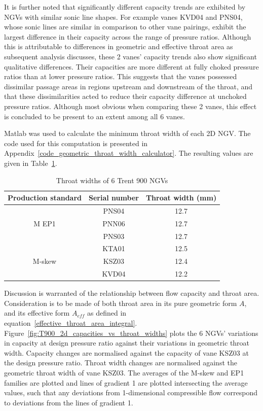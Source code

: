 \documentclass[a4paper, 11pt, oneside]{report}
\begin{document}
It is further noted that significantly different capacity trends are exhibited by NGVs with similar sonic line shapes. For example vanes KVD04 and PNS04, whose sonic lines are similar in comparison to other vane pairings, exhibit the largest difference in their capacity across the range of pressure ratios. Although this is attributable to differences in geometric and effective throat area as subsequent analysis discusses, these 2 vanes' capacity trends  also show significant qualitative differences. Their capacities are more different at fully choked pressure ratios than at lower pressure ratios. This suggests that the vanes possessed dissimilar passage areas in regions upstream and downstream of the throat, and that these dissimilarities acted to reduce their capacity difference at unchoked pressure ratios. Although most obvious when comparing these 2 vanes, this effect is concluded to be present to an extent among all 6 vanes.

Matlab was used to calculate the minimum throat width of each 2D NGV. The code used for this computation is presented in Appendix~\ref{code_geometric_throat_width_calculator}. The resulting values are given in Table~\ref{T900_throat_widths}.

\begin{table}[H]
\caption{Throat widths of 6 Trent 900 NGVs}
\label{T900_throat_widths}
\begin{center}
\begin{tabular}{|c|c|c|}
\hline
Production standard & Serial number & Throat width (mm)\\
\hline
\multirow{3}{*}{M EP1} & PNS04 & 12.7\\
 & PNN06 & 12.7\\
 & PNS03 & 12.7\\
\hline
\multirow{3}{*}{M-skew} & KTA01 & 12.5\\
 & KSZ03 & 12.4\\
 & KVD04 & 12.2\\
\hline
\end{tabular}
\end{center}
\end{table}

Discussion is warranted of the relationship between flow capacity and throat area. Consideration is to be made of both throat area in its pure geometric form $A$, and its effective form $A_{eff}$ as defined in equation~\ref{effective_throat_area_integral}. Figure~\ref{fig:T900_2d_capacities_vs_throat_widths} plots the 6 NGVs' variations in capacity at design pressure ratio against their variations in geometric throat width. Capacity changes are normalised against the capacity of vane KSZ03 at the design pressure ratio. Throat width changes are normalised against the geometric throat width of vane KSZ03. The averages of the M-skew and EP1 families are plotted and lines of gradient 1 are plotted intersecting the average values, such that any deviations from 1-dimensional compressible flow correspond to deviations from the lines of gradient 1.
\end{document}
